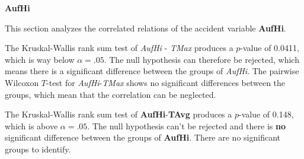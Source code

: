 \Large
\centerline{\textbf{AufHi}}
\normalsize
This section analyzes the correlated relations of the accident variable \textbf{AufHi}.

The Kruskal-Wallis rank sum test of \textit{AufHi} - \textit{TMax} produces a $p$-value of 0.0411, which is way below $\alpha=.05$. The null hypothesis can therefore be rejected, which means there is a significant difference between the groups of \textit{AufHi}. The pairwise Wilcoxon $T$-test for \textit{AufHi}-\textit{TMax} shows no significant differences between the groups, which mean that the correlation can be neglected.

The Kruskal-Wallis rank sum test of \textbf{AufHi}-\textbf{TAvg} produces a $p$-value of 0.148, which is above $\alpha=.05$. The null hypothesis can't be rejected and there is \textbf{no} significant difference between the groups of \textbf{AufHi}. There are no significant groups to identify.

